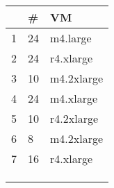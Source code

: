 {\scriptsize
\begin{tabular}{@{}lll@{}}
\toprule
     & \#     & VM         \\ \midrule
1    & 24     & m4.large  \\
2    & 24     & r4.xlarge   \\
3    & 10     & m4.2xlarge   \\
4    & 24     & m4.xlarge \\
5    & 10     & r4.2xlarge   \\
6    & 8      & m4.2xlarge   \\
7    & 16     & r4.xlarge   \\
     &        &            \\
     &        &            \\
     &        &            \\ \bottomrule
\end{tabular}
}
